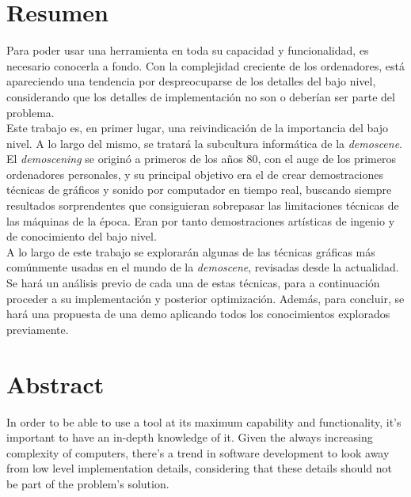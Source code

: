 
\chapter*{Resumen}

Para poder usar una herramienta en toda su capacidad y funcionalidad, es necesario conocerla a fondo. Con la complejidad creciente de los ordenadores, está apareciendo una tendencia por despreocuparse de los detalles del bajo nivel, considerando que los detalles de implementación no son o deberían ser parte del problema.\\

Este trabajo es, en primer lugar, una reivindicación de la importancia del bajo nivel. A lo largo del mismo, se tratará la subcultura informática de la \emph{demoscene}.\\

El \emph{demoscening} se originó a primeros de los años 80, con el auge de los primeros ordenadores personales, y su principal objetivo era el de crear demostraciones técnicas de gráficos y sonido por computador en tiempo real, buscando siempre resultados sorprendentes que consiguieran sobrepasar las limitaciones técnicas de las máquinas de la época. Eran por tanto demostraciones artísticas de ingenio y de conocimiento del bajo nivel.\\

A lo largo de este trabajo se explorarán algunas de las técnicas gráficas más comúnmente usadas en el mundo de la \emph{demoscene}, revisadas desde la actualidad. Se hará un análisis previo de cada una de estas técnicas, para a continuación proceder a su implementación y posterior optimización.
Además, para concluir, se hará una propuesta de una demo aplicando todos los conocimientos explorados previamente.

\chapter*{Abstract}
In order to be able to use a tool at its maximum capability and functionality, it's important to have an in-depth knowledge of it. Given the always increasing complexity of computers, there's a trend in software development to look away from low level implementation details, considering that these details should not be part of the problem's solution.\\

